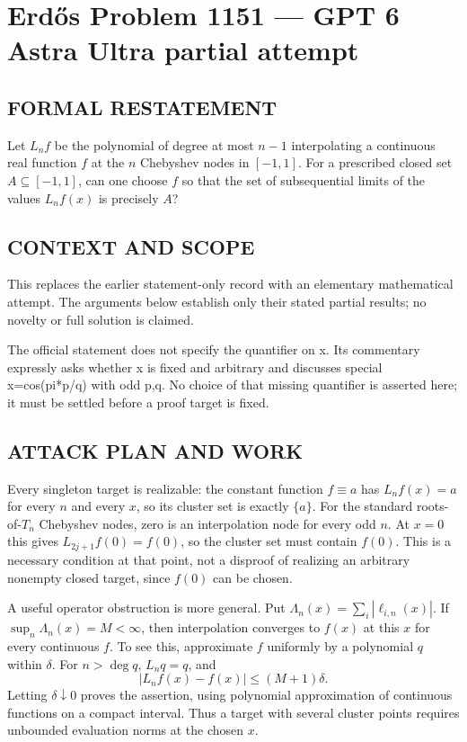 \section*{Erd\H{o}s Problem 1151 --- GPT 6 Astra Ultra partial attempt}


\subsection*{FORMAL RESTATEMENT}
Let $L_nf$ be the polynomial of degree at most $n-1$ interpolating a continuous real function $f$ at the $n$ Chebyshev nodes in $[-1,1]$. For a prescribed closed set $A\subseteq[-1,1]$, can one choose $f$ so that the set of subsequential limits of the values $L_nf(x)$ is precisely $A$?

\subsection*{CONTEXT AND SCOPE}
This replaces the earlier statement-only record with an elementary mathematical attempt. The arguments below establish only their stated partial results; no novelty or full solution is claimed.

The official statement does not specify the quantifier on x. Its commentary expressly asks whether x is fixed and arbitrary and discusses special x=cos(pi*p/q) with odd p,q. No choice of that missing quantifier is asserted here; it must be settled before a proof target is fixed.

\subsection*{ATTACK PLAN AND WORK}
Every singleton target is realizable: the constant function $f\equiv a$ has
$L_nf(x)=a$ for every $n$ and every $x$, so its cluster set is exactly $\{a\}$.
For the standard roots-of-$T_n$ Chebyshev nodes, zero is an interpolation node
for every odd $n$. At $x=0$ this gives $L_{2j+1}f(0)=f(0)$, so the cluster set
must contain $f(0)$. This is a necessary condition at that point, not a disproof
of realizing an arbitrary nonempty closed target, since $f(0)$ can be chosen.

A useful operator obstruction is more general. Put
$\Lambda_n(x)=\sum_i|\ell_{i,n}(x)|$. If $\sup_n\Lambda_n(x)=M<\infty$, then
interpolation converges to $f(x)$ at this $x$ for every continuous $f$.
To see this, approximate $f$ uniformly by a polynomial $q$ within $\delta$.
For $n>\deg q$, $L_nq=q$, and
\[|L_nf(x)-f(x)|\le(M+1)\delta.\]
Letting $\delta\downarrow0$ proves the assertion, using polynomial approximation
of continuous functions on a compact interval. Thus a target with several cluster
points requires unbounded evaluation norms at the chosen $x$.

